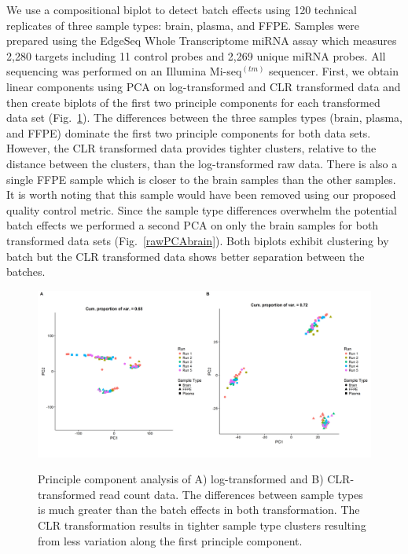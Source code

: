 We use a compositional biplot to detect batch effects using 120 technical replicates of three sample types: brain, plasma, and FFPE.  Samples were prepared using the EdgeSeq Whole Transcriptome miRNA assay which measures 2,280 targets including 11 control probes and 2,269 unique miRNA probes.  All sequencing was performed on an Illumina Mi-seq$^{(tm)}$ sequencer.  First, we obtain linear components using PCA on log-transformed and CLR transformed data and then create biplots of the first two principle components for each transformed data set (Fig.~\ref{rawPCA}).  The differences between the three samples types (brain, plasma, and FFPE) dominate the first two principle components for both data sets.  However, the CLR transformed data provides tighter clusters, relative to the distance between the clusters, than the log-transformed raw data.  There is also a single FFPE sample which is closer to the brain samples than the other samples.  It is worth noting that this sample would have been removed using our proposed quality control metric.  Since the sample type differences overwhelm the potential batch effects we performed a second PCA on only the brain samples for both transformed data sets (Fig.~\ref{rawPCAbrain}).  Both biplots exhibit clustering by batch but the CLR transformed data shows better separation between the batches. 

\begin{figure}
\includegraphics[scale=0.4]{./Figures/IO_PCA_2plot}
\label{rawPCA}
\caption{Principle component analysis of A) log-transformed and B) CLR-transformed read count data.  The differences between sample types is much greater than the batch effects in both transformation.  The CLR transformation results in tighter sample type clusters resulting from less variation along the first principle component. }
\end{figure}



